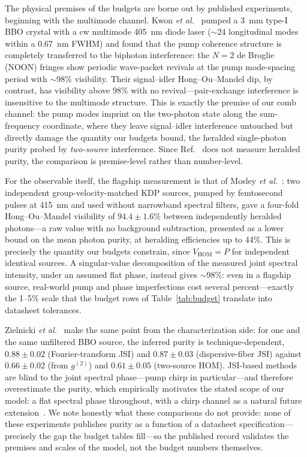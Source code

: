 The physical premises of the budgets are borne out by published
experiments, beginning with the multimode channel. Kwon
\emph{et al.}~\cite{kwon2009} pumped a 3~mm type-I BBO crystal with a
cw multimode 405~nm diode laser ($\sim$24 longitudinal modes within a
0.67~nm FWHM) and found that the pump coherence structure is
completely transferred to the biphoton interference: the $N = 2$
de Broglie (NOON) fringes show periodic wave-packet revivals at the
pump mode-spacing period with $\sim$98\% visibility. Their
signal--idler Hong--Ou--Mandel dip, by contrast, has visibility above
98\% with no revival---pair-exchange interference is insensitive to
the multimode structure. This is exactly the premise of our comb
channel: the pump modes imprint on the two-photon state along the
sum-frequency coordinate, where they leave signal--idler interference
untouched but directly damage the quantity our budgets bound, the
heralded single-photon purity probed by \emph{two-source}
interference. Since Ref.~\cite{kwon2009} does not measure heralded
purity, the comparison is premise-level rather than number-level.

For the observable itself, the flagship measurement is that of Mosley
\emph{et al.}~\cite{mosley2008}: two independent
group-velocity-matched KDP sources, pumped by femtosecond pulses at
415~nm and used without narrowband spectral filters, gave a four-fold
Hong--Ou--Mandel visibility of $94.4 \pm 1.6\%$ between independently
heralded photons---a raw value with no background subtraction,
presented as a lower bound on the mean photon purity, at heralding
efficiencies up to 44\%. This is precisely the quantity our budgets
constrain, since $V_{\mathrm{HOM}} = P$ for independent identical
sources. A singular-value decomposition of the measured joint
spectral intensity, under an assumed flat phase, instead gives
$\sim$98\%: even in a flagship source, real-world pump and phase
imperfections cost several percent---exactly the 1--5\% scale that
the budget rows of Table~\ref{tab:budget} translate into datasheet
tolerances.

Zielnicki \emph{et al.}~\cite{zielnicki2018} make the same point from
the characterization side: for one and the same unfiltered BBO
source, the inferred purity is technique-dependent, $0.88 \pm 0.02$
(Fourier-transform JSI) and $0.87 \pm 0.03$ (dispersive-fiber JSI)
against $0.66 \pm 0.02$ (from $g^{(2)}$) and $0.61 \pm 0.05$
(two-source HOM). JSI-based methods are blind to the joint spectral
phase---pump chirp in particular---and therefore overestimate the
purity, which empirically motivates the stated scope of our model:
a flat spectral phase throughout, with a chirp channel as a natural
future extension~\cite{sanchezlozano2012}. We note honestly what
these comparisons do not provide: none of these experiments publishes
purity as a function of a datasheet specification---precisely the gap
the budget tables fill---so the published record validates the
premises and scales of the model, not the budget numbers themselves.

